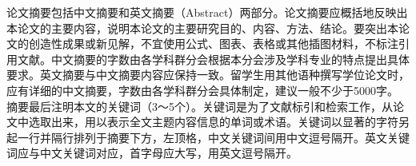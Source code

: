 \begin{comment} %
设置文档样式: 在artratex.sty中搜索关键字定位相应命令，然后修改
\begin{enumerate}
    \item 正文行距：启用和设置 \verb|\linespread{1.25}|，默认1.25倍行距。
    \item 参考文献行距：修改 \verb|\setlength{\bibsep}{0.0ex}|
    \item 目录显示级数：修改 \verb|\setcounter{tocdepth}{2}|
    \item 文档超链接的颜色及其显示：修改 \verb|\hypersetup|
\end{enumerate}

文档内字体切换方法：
    \begin{itemize}
        \item 宋体：国科大论文模板ucasthesis 或 \textrm{国科大论文模板ucasthesis}
        \item 粗宋体：{\bfseries 国科大论文模板ucasthesis} 或 \textbf{国科大论文模板ucasthesis}
        \item 黑体：{\sffamily 国科大论文模板ucasthesis} 或 \textsf{国科大论文模板ucasthesis}
        \item 粗黑体：{\bfseries\sffamily 国科大论文模板ucasthesis} 或 \textsf{\bfseries 国科大论文模板ucasthesis}
        \item 仿宋：{\ttfamily 国科大论文模板ucasthesis} 或 \texttt{国科大论文模板ucasthesis}
        \item 粗仿宋：{\bfseries\ttfamily 国科大论文模板ucasthesis} 或 \texttt{\bfseries 国科大论文模板ucasthesis}
        \item 楷体：{\itshape 国科大论文模板ucasthesis} 或 \textit{国科大论文模板ucasthesis}
        \item 粗楷体：{\bfseries\itshape 国科大论文模板ucasthesis} 或 \textit{\bfseries 国科大论文模板ucasthesis}
    \end{itemize}
\end{comment}

论文摘要包括中文摘要和英文摘要（Abstract）两部分。论文摘要应概括地反映出本论文的主要内容，说明本论文的主要研究目的、内容、方法、结论。要突出本论文的创造性成果或新见解，不宜使用公式、图表、表格或其他插图材料，不标注引用文献。中文摘要的字数由各学科群分会根据本分会涉及学科专业的特点提出具体要求。英文摘要与中文摘要内容应保持一致。留学生用其他语种撰写学位论文时，应有详细的中文摘要，字数由各学科群分会具体制定，建议一般不少于5000字。
摘要最后注明本文的关键词（3～5个）。关键词是为了文献标引和检索工作，从论文中选取出来，用以表示全文主题内容信息的单词或术语。关键词以显著的字符另起一行并隔行排列于摘要下方，左顶格，中文关键词间用中文逗号隔开。英文关键词应与中文关键词对应，首字母应大写，用英文逗号隔开。


